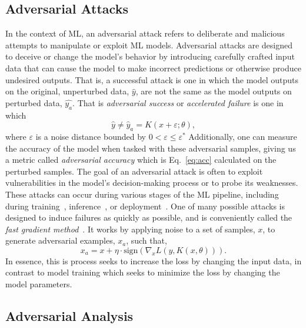 \documentclass[sn-mathphys-num]{sn-jnl}%
\begin{document}
\subsection{Adversarial Attacks}
\label{attacks}
In the context of ML, an adversarial attack refers to deliberate and malicious attempts to manipulate or exploit ML models. Adversarial attacks are designed to deceive or change the model's behavior by introducing carefully crafted input data that can cause the model to make incorrect predictions or otherwise produce undesired outputs. That is, a successful attack is one in which the model outputs on the original, unperturbed data, $\hat{y}$, are not the same as the model outputs on perturbed data, $\hat{y_a}$. That is \textit{adversarial success} or \textit{accelerated failure} is one in which
\begin{equation}
    \hat{y} \neq \hat{y}_a = K(x + \varepsilon; \theta ) ,
\label{eq:adv_success}
\end{equation}
where $\varepsilon$ is a noise distance bounded by $0 < \varepsilon \leq \varepsilon^*$
Additionally, one can measure the accuracy of the model when tasked with these adversarial samples, giving us a metric called \textit{adversarial accuracy} which is Eq.~\ref{eq:acc} calculated on the perturbed samples.
The goal of an adversarial attack is often to exploit vulnerabilities in the model's decision-making process or to probe its weaknesses.
These attacks can occur during various stages of the ML pipeline, including during training~\cite{biggio_poisoning_2013,saha2020hidden}, inference~\cite{chakraborty_adversarial_2018,orekondy2019knockoff}, or deployment~\cite{chakraborty_adversarial_2018,choquette2021label,li2021membership,carlini_towards_2017,adversarialpatch,pixelattack,hopskipjump}.
One of many possible attacks is designed to induce failures as quickly as possible, and is  conveniently called the \textit{fast gradient method}~\cite{fgm}. It works by applying noise to a set of samples, $x$, to generate adversarial examples, $x_a$, such that,
\begin{equation}
x_a = x + \eta \cdot \mathrm{sign}(\nabla_x L(y, K(x, \theta))).
\label{eq:fgm}
\end{equation}
In essence, this is process seeks to increase the loss by changing the input data, in contrast to model training which seeks to minimize the loss by changing the model parameters.


\subsection{Adversarial Analysis}
\end{document}
